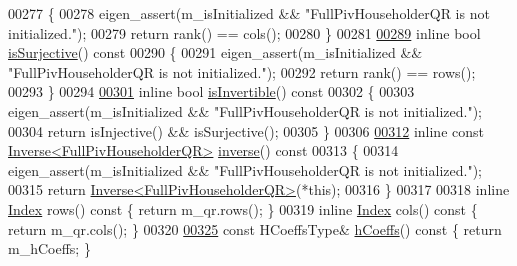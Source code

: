 \begin{DoxyCode}
00277 \textcolor{keyword}{    }\{
00278       eigen\_assert(m\_isInitialized && \textcolor{stringliteral}{"FullPivHouseholderQR is not initialized."});
00279       \textcolor{keywordflow}{return} rank() == cols();
00280     \}
00281 
\hyperlink{group___q_r___module_aa3593db4708ce9079b0bdf219b99f57e}{00289}     \textcolor{keyword}{inline} \textcolor{keywordtype}{bool} \hyperlink{group___q_r___module_aa3593db4708ce9079b0bdf219b99f57e}{isSurjective}()\textcolor{keyword}{ const}
00290 \textcolor{keyword}{    }\{
00291       eigen\_assert(m\_isInitialized && \textcolor{stringliteral}{"FullPivHouseholderQR is not initialized."});
00292       \textcolor{keywordflow}{return} rank() == rows();
00293     \}
00294 
\hyperlink{group___q_r___module_aeb1d779ec22ec68a5a28d4235db02ec1}{00301}     \textcolor{keyword}{inline} \textcolor{keywordtype}{bool} \hyperlink{group___q_r___module_aeb1d779ec22ec68a5a28d4235db02ec1}{isInvertible}()\textcolor{keyword}{ const}
00302 \textcolor{keyword}{    }\{
00303       eigen\_assert(m\_isInitialized && \textcolor{stringliteral}{"FullPivHouseholderQR is not initialized."});
00304       \textcolor{keywordflow}{return} isInjective() && isSurjective();
00305     \}
00306 
\hyperlink{group___q_r___module_a352ce66397af06da214ddde343cec6f5}{00312}     \textcolor{keyword}{inline} \textcolor{keyword}{const} \hyperlink{class_eigen_1_1_inverse}{Inverse<FullPivHouseholderQR>} 
      \hyperlink{group___q_r___module_a352ce66397af06da214ddde343cec6f5}{inverse}()\textcolor{keyword}{ const}
00313 \textcolor{keyword}{    }\{
00314       eigen\_assert(m\_isInitialized && \textcolor{stringliteral}{"FullPivHouseholderQR is not initialized."});
00315       \textcolor{keywordflow}{return} \hyperlink{class_eigen_1_1_inverse}{Inverse<FullPivHouseholderQR>}(*this);
00316     \}
00317 
00318     \textcolor{keyword}{inline} \hyperlink{namespace_eigen_a62e77e0933482dafde8fe197d9a2cfde}{Index} rows()\textcolor{keyword}{ const }\{ \textcolor{keywordflow}{return} m\_qr.rows(); \}
00319     \textcolor{keyword}{inline} \hyperlink{namespace_eigen_a62e77e0933482dafde8fe197d9a2cfde}{Index} cols()\textcolor{keyword}{ const }\{ \textcolor{keywordflow}{return} m\_qr.cols(); \}
00320     
\hyperlink{group___q_r___module_a874fcd822871010f7961d9e94f1767e4}{00325}     \textcolor{keyword}{const} HCoeffsType& \hyperlink{group___q_r___module_a874fcd822871010f7961d9e94f1767e4}{hCoeffs}()\textcolor{keyword}{ const }\{ \textcolor{keywordflow}{return} m\_hCoeffs; \}

\end{DoxyCode}
